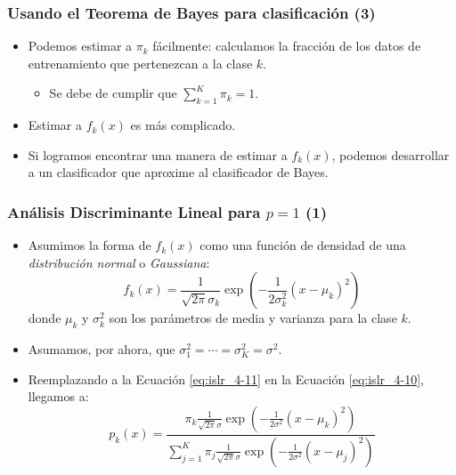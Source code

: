 \documentclass[usenames,dvipsnames]{beamer} %
\newcommand\defi[1]{\textcolor{NavyBlue}{\textit{#1}}}
\begin{document}
\begin{frame}\frametitle{Usando el Teorema de Bayes para clasificaci\'on (3)}
\begin{itemize}
	\item Podemos estimar a $\pi_k$ f\'acilmente: calculamos la fracci\'on de los datos de entrenamiento que pertenezcan a la clase $k$.
	\begin{itemize}
		\item Se debe de cumplir que	 $\sum_{k=1}^{K}\pi_k = 1$.
	\end{itemize}
	\item Estimar a $f_k(x)$ es m\'as complicado.
	\item Si logramos encontrar una manera de estimar a $f_k(x)$, podemos desarrollar a un clasificador que aproxime al clasificador de Bayes.
\end{itemize}
\end{frame}

\begin{frame}\frametitle{An\'alisis Discriminante Lineal para $p=1$ (1)}
\begin{itemize}
	\item Asumimos la forma de $f_k(x)$ como una funci\'on de densidad de una \defi{distribuci\'on normal} o \defi{Gaussiana}:
	\begin{equation}\label{eq:islr_4-11}
	f_k(x) = \frac{1}{\sqrt{2\pi}\sigma_{k}}\exp{\left( -\frac{1}{2\sigma_{k}^{2}}(x-\mu_k)^2 \right)}
	\end{equation}
	donde $\mu_k$ y $\sigma_k^2$ son los par\'ametros de media y varianza para la clase $k$.
	\item Asumamos, por ahora, que $\sigma_1^2=\dotsb=\sigma_K^2=\sigma^2$.
	\item Reemplazando a la Ecuaci\'on \ref{eq:islr_4-11} en la Ecuaci\'on \ref{eq:islr_4-10}, llegamos a:
	\begin{equation}\label{eq:islr_4-12}
	p_k(x)=\frac{\pi_k \frac{1}{\sqrt{2\pi}\sigma}\exp{\left( -\frac{1}{2\sigma^{2}}(x-\mu_k)^2 \right)}}{\sum_{j=1}^{K}\pi_j \frac{1}{\sqrt{2\pi}\sigma}\exp{\left( -\frac{1}{2\sigma^{2}}(x-\mu_j)^2 \right)}}
	\end{equation}
\end{itemize}
\end{frame}
\end{document}
